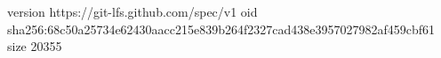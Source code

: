 version https://git-lfs.github.com/spec/v1
oid sha256:68c50a25734e62430aacc215e839b264f2327cad438e3957027982af459cbf61
size 20355

